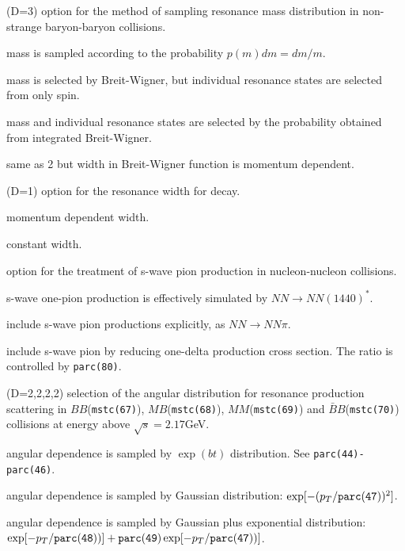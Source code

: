 \documentclass[]{article}
\newenvironment{entry}%
{\begin{list}{}{\setlength{\topsep}{0mm} \setlength{\itemsep}{0mm}
\setlength{\parskip}{0mm} \setlength{\parsep}{0mm}
\setlength{\leftmargin}{20mm} \setlength{\rightmargin}{0mm}
\setlength{\labelwidth}{18mm} \setlength{\labelsep}{2mm}}}%
{\end{list}}
\newenvironment{subentry}%
{\begin{list}{}{\setlength{\topsep}{0mm} \setlength{\itemsep}{0mm}
\setlength{\parskip}{0mm} \setlength{\parsep}{0mm}
\setlength{\leftmargin}{10mm} \setlength{\rightmargin}{0mm}
\setlength{\labelwidth}{18mm} \setlength{\labelsep}{2mm}}}%
{\end{list}}
\newcommand{\ttt}[1]{{\tt#1}}
\newcommand{\itemt}[1]{\item[{\tt #1}\hfill]}
\newcommand{\srt}{\mbox{$\sqrt{s}$}}
\newcommand{\Bbar}{\mbox{$\bar B$}}
\begin{document}
\begin{entry}
\itemt{mstc(64) :}(D=3) option for the method of sampling resonance mass
                        distribution in non-strange baryon-baryon collisions.
 \begin{subentry}
  \itemt{$=0$:} mass is sampled according to the probability $p(m)dm= dm/m$.
  \itemt{$=1$:} mass is selected by Breit-Wigner,
                but individual resonance states are selected from only spin.
  \itemt{$=2$:} mass and individual resonance states are selected by
                the probability obtained from integrated Breit-Wigner.
  \itemt{$=3$:} same as 2 but width in Breit-Wigner function
                is momentum dependent.
 \end{subentry}

\itemt{mstc(65) :} (D=1) option for the resonance width for decay.
 \begin{subentry}
         \itemt{$=1$ :} momentum dependent width.
         \itemt{$=0$ :} constant width.
 \end{subentry}

\itemt{mstc(66)(D=0) :} option for the treatment of s-wave pion production
   in nucleon-nucleon collisions. 
 \begin{subentry}
    \itemt{$=0$ :} s-wave one-pion production is effectively simulated by
        $NN \to NN(1440)^*$.
    \itemt{$=1$ :} include s-wave pion productions explicitly,
                   as $NN\to NN\pi$.
    \itemt{$=2$ :} include s-wave pion by reducing one-delta production cross
    section. The ratio is controlled by \ttt{parc(80)}.
 \end{subentry}

\itemt{mstc(67),mstc(68),mstc(69),mstc(70) :} (D=2,2,2,2)
     selection of the angular distribution for
     resonance production scattering in $BB$(\ttt{mstc(67)}),
     $MB$(\ttt{mstc(68)}), $MM$(\ttt{mstc(69)}) and $\Bbar B$(\ttt{mstc(70)})
     collisions at energy above $\srt=2.17$GeV.
 \begin{subentry}
    \itemt{$=2$ :} angular dependence is sampled by $\exp(bt)$ distribution.
                   See \ttt{parc(44)-parc(46)}.
    \itemt{$=4$ :} angular dependence is sampled by Gaussian distribution:
                   $\exp[-(p_T/\ttt{parc(47)})^2]$.
    \itemt{$=5$ :} angular dependence is sampled by Gaussian plus
                    exponential distribution:
        $\exp[-p_T/\ttt{parc(48)})]+\ttt{parc(49)}\exp[-p_T/\ttt{parc(47)})]$.
 \end{subentry}
\medskip


\end{entry}
\end{document}
